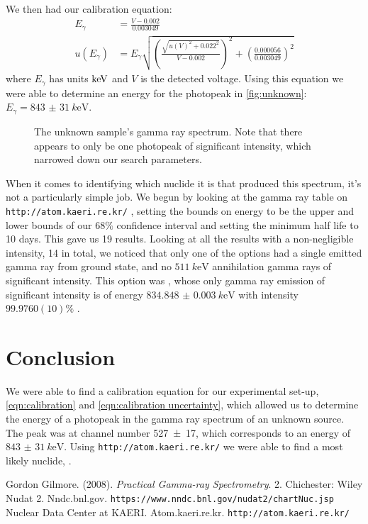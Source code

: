 \documentclass[11pt]{article}
\numberwithin{equation}{section}
\numberwithin{figure}{section}
\numberwithin{table}{section}
\begin{document}
    \par We then had our calibration equation:
    \begin{align}
        E_{\gamma}&=\frac{V-0.002}{0.003049}\label{eqn:calibration}\\
        u(E_{\gamma})&=E_{\gamma}\sqrt{\left(\frac{\sqrt{u(V)^2+0.022^2}}{V-0.002}\right)^2 + \left(\frac{0.000056}{0.003049}\right)^2}\label{eqn:calibration uncertainty}
    \end{align}
    where $E_\gamma$ has units $\si[]{k\electronvolt}$ and $V$ is the detected voltage. Using this equation we were able to determine an energy for the photopeak in \autoref{fig:unknown}: $E_\gamma=\SI{843(31)}{k\electronvolt}$. 

    \begin{figure}
        \caption{The unknown sample's gamma ray spectrum. Note that there appears to only be one photopeak of significant intensity, which narrowed down our search parameters.}
        \label{fig:unknown}
    \end{figure}

    \par When it comes to identifying which nuclide it is that produced this spectrum, it's not a particularly simple job. We begun by looking at the gamma ray table on \texttt{http://atom.kaeri.re.kr/} \cite{kaeri}, setting the bounds on energy to be the upper and lower bounds of our $68\%$ confidence interval and setting the minimum half life to 10 days. This gave us 19 results. Looking at all the results with a non-negligible intensity, 14 in total, we noticed that only one of the options had a single emitted gamma ray from ground state, and no $\SI{511}{k\electronvolt}$ annihilation gamma rays of significant intensity. This option was , whose only gamma ray emission of significant intensity is  of energy $\SI{834.848(3)}{k\electronvolt}$ with intensity $99.9760(10)\%$ \cite{nudat}. 
    \clearpage
    
    \section{Conclusion}\label{sec:Conclusion}
    \par We were able to find a calibration equation for our experimental set-up, \autoref{eqn:calibration} and \autoref{eqn:calibration uncertainty}, which allowed us to determine the energy of a photopeak in the gamma ray spectrum of an unknown source. The peak was at channel number \num{527(17)}, which corresponds to an energy of $\SI{843(31)}{k\electronvolt}$. Using \texttt{http://atom.kaeri.re.kr/} \cite{kaeri} we were able to find a most likely nuclide, .

    \begin{thebibliography}{9}
        Gordon Gilmore. (2008). \textit{Practical Gamma-ray Spectrometry}. 2. Chichester: Wiley
        Nudat 2. Nndc.bnl.gov. \texttt{https://www.nndc.bnl.gov/nudat2/chartNuc.jsp}
        Nuclear Data Center at KAERI. Atom.kaeri.re.kr. \texttt{http://atom.kaeri.re.kr/}
    \end{thebibliography}
    
\end{document}
